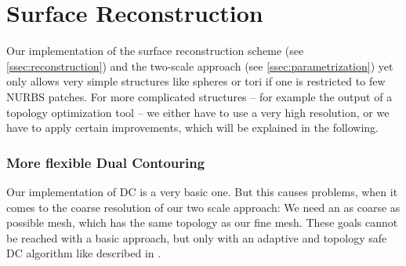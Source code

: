 \chapter{Surface Reconstruction}
\label{appx:AltSurfRecon}
Our implementation of the surface reconstruction scheme (see \autoref{ssec:reconstruction}) and the two-scale approach (see \autoref{ssec:parametrization}) yet only allows very simple structures like spheres or tori if one is restricted to few NURBS patches. For more complicated structures -- for example the output of a topology optimization tool -- we either have to use a very high resolution, or we have to apply certain improvements, which will be explained in the following.

\subsection*{More flexible Dual Contouring}
Our implementation of \ac{DC} is a very basic one. But this causes problems, when it comes to the coarse resolution of our two scale approach: We need an as coarse as possible mesh, which has the same topology as our fine mesh. These goals cannot be reached with a basic approach, but only with an adaptive and topology safe \ac{DC} algorithm like described in \cite{Hermite2002}.

